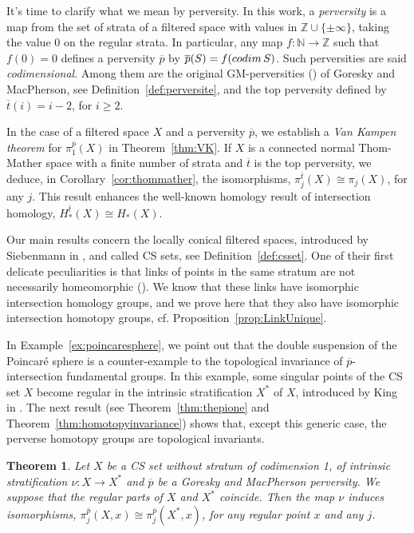 \documentclass[a4paper,10pt,english,reqno]{amsart}
\theoremstyle{plain}
\newtheorem{theorem}{Theorem}
\theoremstyle{definition}
\theoremstyle{remark}
\numberwithin{equation}{section}
\newcommand{\thmref}[1]{Theorem~\ref{#1}}
\newcommand{\propref}[1]{Proposition~\ref{#1}}
\newcommand{\corref}[1]{Corollary~\ref{#1}}
\newcommand{\exemref}[1]{Example~\ref{#1}}
\newcommand{\defref}[1]{Definition~\ref{#1}}
\def\ov{\overline}
\def\N{\mathbb{N}}
\def\Z{\mathbb{Z}}
\def\codim{{\rm codim\,}}
\renewcommand\1{\hbox{\ding{192}}}
\renewcommand\2{\hbox{\ding{193}}}
\newcommand\3{\hbox{\ding{194}}}
\newcommand\4{\hbox{\ding{195}}}
\begin{document}
\smallskip
%
It's time to clarify what we mean by perversity. In this work, a \emph{perversity} is a map from the set of strata of a filtered space with values in $\Z\cup\{\pm\infty\}$,
taking the value 0 on the regular strata.
In particular, any map $f\colon \N\to\Z$ such that $f(0)=0$ defines a perversity $\ov{p}$ 
 by $\ov{p}(S)=f(\codim S)$.  Such perversities are said \emph{codimensional}. 
 Among them are the original GM-perversities (\cite{GM1}) of Goresky and MacPherson, see \defref{def:perversite},
 and the top perversity defined by $\ov{t}(i)=i-2$, for $i\geq 2$. 
%
 


\smallskip
In the case of a filtered space $X$ and a perversity $\ov{p}$, we establish a \emph{Van Kampen theorem} for $\pi^{\ov{p}}_{1}(X)$ in \thmref{thm:VK}.
If $X$ is a connected normal Thom-Mather space with a finite number of strata and $\ov{t}$ is the top perversity, 
we deduce, in \corref{cor:thommather},
the isomorphisms, $\pi_{j}^{\ov{t}}(X)\cong \pi_{j}(X)$, for any $j$.
This result enhances the well-known homology result of intersection homology, $H_{*}^{\ov{t}}(X)\cong H_{*}(X)$.

\smallskip
Our main results concern the locally conical filtered spaces, introduced by Siebenmann in \cite{MR0319207}, 
and called CS sets, see \defref{def:csset}. 
One of their first delicate peculiarities 
is that links of points in the same stratum are 
not necessarily homeomorphic (\cite[Example 2.3.6]{FriedmanBook}). 
We know that these links have isomorphic intersection homology groups,
and we prove here that they also have isomorphic intersection homotopy groups, cf. \propref{prop:LinkUnique}.


\smallskip
In \exemref{ex:poincaresphere}, we point out that the double suspension of the Poincar\'e sphere 
is a counter-example to the topological invariance of $\ov{p}$-intersection fundamental groups.
%
%
In this example, some singular points of the CS set $X$ become regular in the intrinsic stratification
$X^*$ of $X$, introduced by King in \cite{MR800845}.
The next  result (see \thmref{thm:thepione} and \thmref{thm:homotopyinvariance}) shows that, 
except this generic case, the perverse homotopy groups are topological invariants. 

\begin{theorem}\label{thm:thepioneintro}
Let $X$ be a CS set without stratum of codimension 1, of intrinsic stratification $\nu\colon X\to X^*$ and
$\ov{p}$ be a Goresky and MacPherson perversity.  
We suppose that the regular parts of $X$ and $X^*$ coincide. 
%
Then the map $\nu$ induces  isomorphisms,
$\pi_{j}^{\ov{p}}(X,x)\cong \pi_{j}^{\ov{p}}(X^*,x)$,
for any regular point $x$ and any $j$.
%
\end{theorem}
\end{document}
